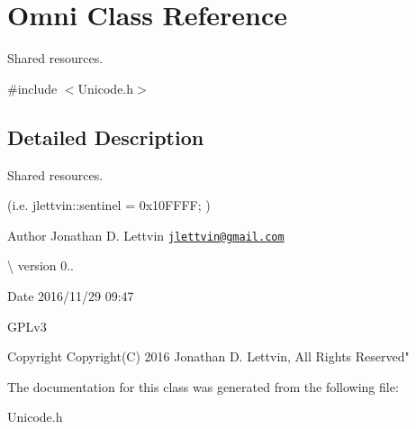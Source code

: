 \hypertarget{class_omni}{}\section{Omni Class Reference}
\label{class_omni}


Shared resources.  




{\ttfamily \#include $<$Unicode.\+h$>$}



\subsection{Detailed Description}
Shared resources. 

(i.\+e. jlettvin\+::sentinel = 0x10\+F\+F\+F\+F; )

\begin{DoxyAuthor}{Author}
Jonathan D. Lettvin \href{mailto:jlettvin@gmail.com}{\tt jlettvin@gmail.\+com}
\end{DoxyAuthor}
\textbackslash{} version 0..

\begin{DoxyDate}{Date}
2016/11/29 09\+:47
\end{DoxyDate}
G\+P\+Lv3

\begin{DoxyCopyright}{Copyright}
Copyright(\+C) 2016 Jonathan D. Lettvin, All Rights Reserved" 
\end{DoxyCopyright}


The documentation for this class was generated from the following file\+:\begin{DoxyCompactItemize}
\item 
Unicode.\+h\end{DoxyCompactItemize}
